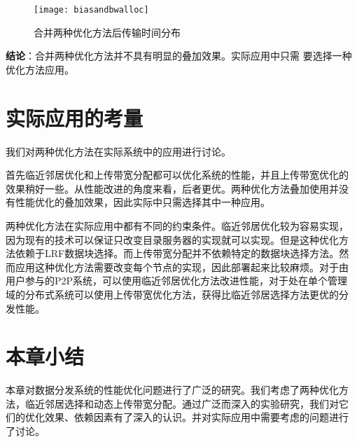 \begin{figure}[htbp]
  \centering
  \begin{minipage}{0.6\linewidth}
    \centering
    \texttt{[image: biasandbwalloc]}
    \caption{合并两种优化方法后传输时间分布}
    \label{fig:biasandbwalloc}
  \end{minipage}
\end{figure}

\textbf{结论}：合并两种优化方法并不具有明显的叠加效果。实际应用中只需
要选择一种优化方法应用。



\section{实际应用的考量}
\label{sec:btsuggest}

我们对两种优化方法在实际系统中的应用进行讨论。

首先临近邻居优化和上传带宽分配都可以优化系统的性能，并且上传带宽优化的
效果稍好一些。从性能改进的角度来看，后者更优。两种优化方法叠加使用并没
有性能优化的叠加效果，因此实际中只需选择其中一种应用。

两种优化方法在实际应用中都有不同的约束条件。临近邻居优化较为容易实现，
因为现有的技术可以保证只改变目录服务器的实现就可以实现。但是这种优化方
法依赖于LRF数据块选择。而上传带宽分配并不依赖特定的数据块选择方法。然
而应用这种优化方法需要改变每个节点的实现，因此部署起来比较麻烦。对于由
用户参与的P2P系统，可以使用临近邻居优化方法改进性能，对于处在单个管理
域的分布式系统可以使用上传带宽优化方法，获得比临近邻居选择方法更优的分
发性能。

\section{本章小结}
\label{sec:btconclude}

本章对数据分发系统的性能优化问题进行了广泛的研究。我们考虑了两种优化方
法，临近邻居选择和动态上传带宽分配。通过广泛而深入的实验研究，我们对它
们的优化效果、依赖因素有了深入的认识。并对实际应用中需要考虑的问题进行
了讨论。
